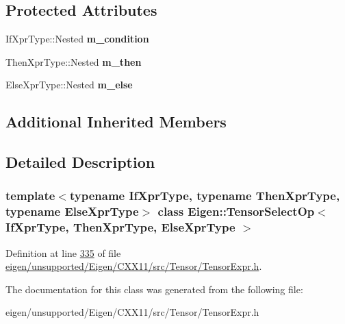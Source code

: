 \subsection*{Protected Attributes}
\begin{DoxyCompactItemize}
\item 
\mbox{\label{class_eigen_1_1_tensor_select_op_ab621b970c85f9bbfe9dc42e0e5e821e3}} 
If\+Xpr\+Type\+::\+Nested {\bfseries m\+\_\+condition}
\item 
\mbox{\label{class_eigen_1_1_tensor_select_op_a100777e88e0cf292d7fd163e7e8888dc}} 
Then\+Xpr\+Type\+::\+Nested {\bfseries m\+\_\+then}
\item 
\mbox{\label{class_eigen_1_1_tensor_select_op_ad0137c2194d61e4e050785e97a8e0ba4}} 
Else\+Xpr\+Type\+::\+Nested {\bfseries m\+\_\+else}
\end{DoxyCompactItemize}
\subsection*{Additional Inherited Members}


\subsection{Detailed Description}
\subsubsection*{template$<$typename If\+Xpr\+Type, typename Then\+Xpr\+Type, typename Else\+Xpr\+Type$>$\newline
class Eigen\+::\+Tensor\+Select\+Op$<$ If\+Xpr\+Type, Then\+Xpr\+Type, Else\+Xpr\+Type $>$}



Definition at line \hyperlink{eigen_2unsupported_2_eigen_2_c_x_x11_2src_2_tensor_2_tensor_expr_8h_source_l00335}{335} of file \hyperlink{eigen_2unsupported_2_eigen_2_c_x_x11_2src_2_tensor_2_tensor_expr_8h_source}{eigen/unsupported/\+Eigen/\+C\+X\+X11/src/\+Tensor/\+Tensor\+Expr.\+h}.



The documentation for this class was generated from the following file\+:\begin{DoxyCompactItemize}
\item 
eigen/unsupported/\+Eigen/\+C\+X\+X11/src/\+Tensor/\+Tensor\+Expr.\+h\end{DoxyCompactItemize}
